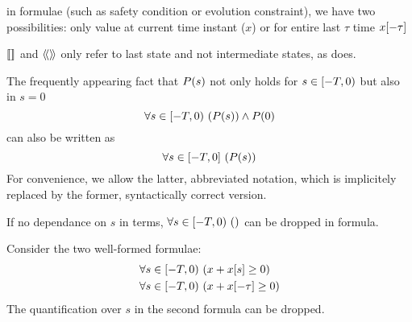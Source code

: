     in formulae (such as safety condition or evolution constraint), we have two possibilities: only value at current time instant ($x$) or for entire last $\tau$ time $x[-\tau]$

    $\dbox{}{}$ and $\ddiamond{}{}$ only refer to last state and not intermediate states, as \dTL does.

    \begin{convention}
        The frequently appearing fact that $P(s)$ not only holds for $s\in[-T,0)$ but also in $s=0$
        \begin{equation*}
            \forall s\in[-T,0){\,} \left(P(s)\right)\land P(0)
        \end{equation*}
        can also be written as
        \begin{equation*}
            \forall s\in[-T,0]{\,} \left(P(s)\right)
        \end{equation*}
        For convenience, we allow the latter, abbreviated notation, which is implicitely replaced by the former, syntactically correct version.
    \end{convention}
    

    If no dependance on $s$ in terms, $\forall s\in[-T,0){\,} \left(\right)$ can be dropped in formula.

    \begin{example}
        Consider the two well-formed \ddL formulae:
        \begin{align*}
            &\forall s\in[-T,0){\,} \left(x+x[s]\geq 0\right)\\
            &\forall s\in[-T,0){\,} \left(x+x[-\tau]\geq 0\right) 
        \end{align*}
        The quantification over $s$ in the second formula can be dropped.
    \end{example}

